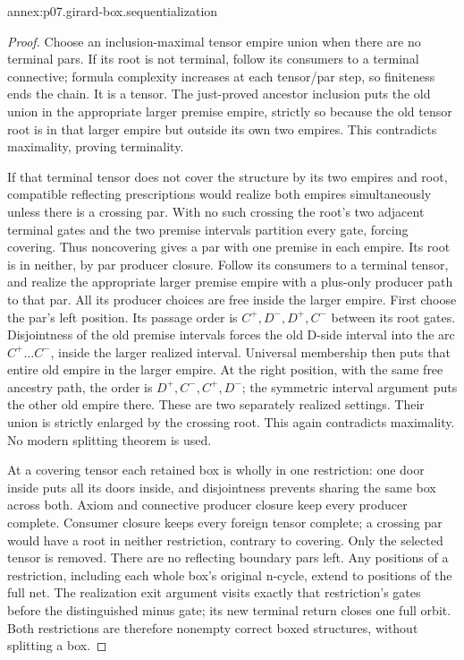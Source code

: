 \begin{annexitem}{annex:p07.girard-box.sequentialization}
\begin{proof}
Choose an inclusion-maximal tensor empire union when there are no
terminal pars. If its root is not terminal, follow its consumers to
a terminal connective; formula complexity increases at each tensor/par
step, so finiteness ends the chain. It is a tensor.
The just-proved ancestor inclusion puts the old union in the
appropriate larger premise empire, strictly so because the old tensor
root is in that larger empire but outside its own two empires.
This contradicts maximality, proving terminality.

If that terminal tensor does not cover the structure by its two
empires and root, compatible reflecting prescriptions would realize
both empires simultaneously unless there is a crossing par.
With no such crossing the root's two adjacent terminal gates and
the two premise intervals partition every gate, forcing covering.
Thus noncovering gives a par with one premise in each empire.
Its root is in neither, by par producer closure. Follow its consumers
to a terminal tensor, and realize the appropriate larger premise
empire with a plus-only producer path to that par.
All its producer choices are free inside the larger empire.
First choose the par's left position. Its passage order is
\(C^+,D^-,D^+,C^-\) between its root gates.
Disjointness of the old premise intervals forces the old D-side
interval into the arc \(C^+\ldots C^-\), inside the larger realized
interval. Universal membership then puts that entire old empire in
the larger empire. At the right position, with the same free ancestry
path, the order is \(D^+,C^-,C^+,D^-\); the symmetric interval argument
puts the other old empire there. These are two separately realized
settings. Their union is strictly enlarged by the crossing root.
This again contradicts maximality. No modern splitting theorem is used.

At a covering tensor each retained box is wholly in one restriction:
one door inside puts all its doors inside, and disjointness prevents
sharing the same box across both. Axiom and connective producer
closure keep every producer complete. Consumer closure keeps every
foreign tensor complete; a crossing par would have a root in neither
restriction, contrary to covering. Only the selected tensor is removed.
There are no reflecting boundary pars left. Any positions of a
restriction, including each whole box's original n-cycle, extend to
positions of the full net. The realization exit argument visits
exactly that restriction's gates before the distinguished minus gate;
its new terminal return closes one full orbit. Both restrictions are
therefore nonempty correct boxed structures, without splitting a box.


\end{proof}
\end{annexitem}
